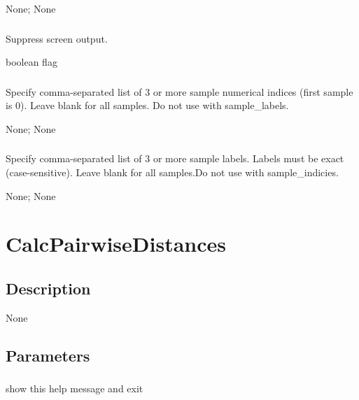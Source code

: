 \documentclass[letterpaper,11pt,english]{sphinxmanual}
\begin{document}
 None;  None


\subsubsection{}
\label{\detokenize{prog_desc:id60}}
 Suppress screen output.

 boolean flag


\subsubsection{}
\label{\detokenize{prog_desc:id61}}
 Specify comma-separated list of 3 or more sample numerical indices (first sample is 0). Leave blank for all samples. Do not use with \textendash{}sample\_labels.

 None;  None


\subsubsection{}
\label{\detokenize{prog_desc:id62}}
 Specify comma-separated list of 3 or more sample labels. Labels must be exact (case-sensitive). Leave blank for all samples.Do not use with \textendash{}sample\_indicies.

 None;  None


\section{CalcPairwiseDistances}
\label{\detokenize{prog_desc:calcpairwisedistances}}

\subsection{Description}
\label{\detokenize{prog_desc:id63}}
None


\subsection{Parameters}
\label{\detokenize{prog_desc:id64}}

\subsubsection{}
\label{\detokenize{prog_desc:id65}}
 show this help message and exit
\end{document}
